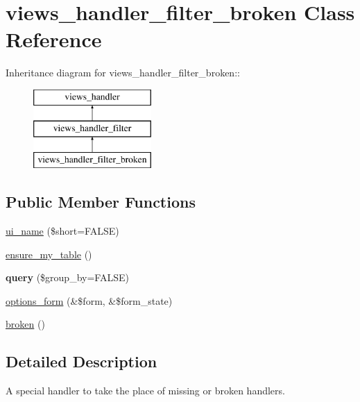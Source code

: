 \hypertarget{classviews__handler__filter__broken}{
\section{views\_\-handler\_\-filter\_\-broken Class Reference}
\label{classviews__handler__filter__broken}
}
Inheritance diagram for views\_\-handler\_\-filter\_\-broken::\begin{figure}[H]
\begin{center}
\leavevmode
\includegraphics[height=3cm]{classviews__handler__filter__broken}
\end{center}
\end{figure}
\subsection*{Public Member Functions}
\begin{DoxyCompactItemize}
\item 
\hyperlink{classviews__handler__filter__broken_a199df5434e076ecc6889082a83f2e266}{ui\_\-name} (\$short=FALSE)
\item 
\hyperlink{classviews__handler__filter__broken_ae85934ec4cf9e01aba2b17ce58ead155}{ensure\_\-my\_\-table} ()
\item 
\hypertarget{classviews__handler__filter__broken_ae88495fc97374169a06d1d986362276f}{
{\bfseries query} (\$group\_\-by=FALSE)}
\label{classviews__handler__filter__broken_ae88495fc97374169a06d1d986362276f}

\item 
\hyperlink{classviews__handler__filter__broken_a51fc714b7aec668a035da8dfb4b4a69a}{options\_\-form} (\&\$form, \&\$form\_\-state)
\item 
\hyperlink{classviews__handler__filter__broken_a912a78cd8ee1d5c139613d252f2ca9e1}{broken} ()
\end{DoxyCompactItemize}


\subsection{Detailed Description}
A special handler to take the place of missing or broken handlers. 

